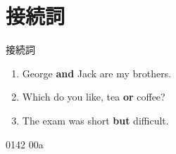 \documentclass[aspectratio=169, xcolor={dvipsnames,table}]{beamer}
\begin{document}
  \section{接続詞}
  \begin{frame}[plain]{接続詞}
    \large

    \begin{enumerate}
      \item George \textbf{and} Jack are my brothers.

      \item Which do you like, tea \textbf{or} coffee?

      \item The exam was short \textbf{but} difficult.
    \end{enumerate}

    \hfill{\tiny 0142}\,{\scriptsize{}\,{\tiny 00a}}
  \end{frame}
\end{document}
